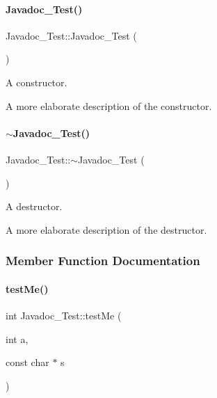 \paragraph{\texorpdfstring{Javadoc\+\_\+\+Test()}{Javadoc\_Test()}}
{\footnotesize\ttfamily Javadoc\+\_\+\+Test\+::\+Javadoc\+\_\+\+Test (\begin{DoxyParamCaption}{ }\end{DoxyParamCaption})}



A constructor. 

A more elaborate description of the constructor. \hypertarget{class_javadoc___test_a60016cd15a4ed82bbc35be79a0a6a6b5}{}\label{class_javadoc___test_a60016cd15a4ed82bbc35be79a0a6a6b5} 
\paragraph{\texorpdfstring{$\sim$\+Javadoc\+\_\+\+Test()}{~Javadoc\_Test()}}
{\footnotesize\ttfamily Javadoc\+\_\+\+Test\+::$\sim$\+Javadoc\+\_\+\+Test (\begin{DoxyParamCaption}{ }\end{DoxyParamCaption})}



A destructor. 

A more elaborate description of the destructor. 

\subsubsection{Member Function Documentation}
\hypertarget{class_javadoc___test_a0c472683ed25ff096e8a9edfb18d550c}{}\label{class_javadoc___test_a0c472683ed25ff096e8a9edfb18d550c} 
\paragraph{\texorpdfstring{test\+Me()}{testMe()}}
{\footnotesize\ttfamily int Javadoc\+\_\+\+Test\+::test\+Me (\begin{DoxyParamCaption}\item[{int}]{a,  }\item[{const char $\ast$}]{s }\end{DoxyParamCaption})}



